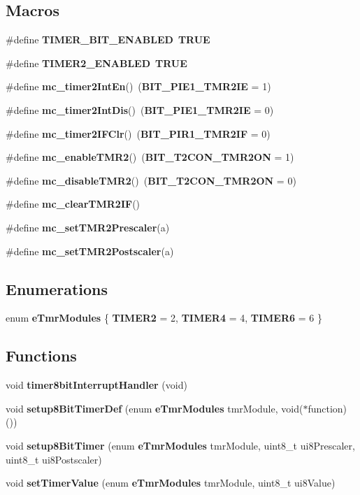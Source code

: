 \subsection*{Macros}
\begin{DoxyCompactItemize}
\item 
\#define {\bf T\-I\-M\-E\-R\-\_\-B\-I\-T\-\_\-\-E\-N\-A\-B\-L\-E\-D}~{\bf T\-R\-U\-E}
\item 
\#define {\bf T\-I\-M\-E\-R2\-\_\-\-E\-N\-A\-B\-L\-E\-D}~{\bf T\-R\-U\-E}
\item 
\#define {\bf mc\-\_\-timer2\-Int\-En}()~({\bf B\-I\-T\-\_\-\-P\-I\-E1\-\_\-\-T\-M\-R2\-I\-E} = 1)
\item 
\#define {\bf mc\-\_\-timer2\-Int\-Dis}()~({\bf B\-I\-T\-\_\-\-P\-I\-E1\-\_\-\-T\-M\-R2\-I\-E} = 0)
\item 
\#define {\bf mc\-\_\-timer2\-I\-F\-Clr}()~({\bf B\-I\-T\-\_\-\-P\-I\-R1\-\_\-\-T\-M\-R2\-I\-F} = 0)
\item 
\#define {\bf mc\-\_\-enable\-T\-M\-R2}()~({\bf B\-I\-T\-\_\-\-T2\-C\-O\-N\-\_\-\-T\-M\-R2\-O\-N} = 1)
\item 
\#define {\bf mc\-\_\-disable\-T\-M\-R2}()~({\bf B\-I\-T\-\_\-\-T2\-C\-O\-N\-\_\-\-T\-M\-R2\-O\-N} = 0)
\item 
\#define {\bf mc\-\_\-clear\-T\-M\-R2\-I\-F}()
\item 
\#define {\bf mc\-\_\-set\-T\-M\-R2\-Prescaler}(a)
\item 
\#define {\bf mc\-\_\-set\-T\-M\-R2\-Postscaler}(a)
\end{DoxyCompactItemize}
\subsection*{Enumerations}
\begin{DoxyCompactItemize}
\item 
enum {\bf e\-Tmr\-Modules} \{ {\bf T\-I\-M\-E\-R2} =  2, 
{\bf T\-I\-M\-E\-R4} =  4, 
{\bf T\-I\-M\-E\-R6} =  6
 \}
\end{DoxyCompactItemize}
\subsection*{Functions}
\begin{DoxyCompactItemize}
\item 
void {\bf timer8bit\-Interrupt\-Handler} (void)
\item 
void {\bf setup8\-Bit\-Timer\-Def} (enum {\bf e\-Tmr\-Modules} tmr\-Module, void($\ast$function)())
\item 
void {\bf setup8\-Bit\-Timer} (enum {\bf e\-Tmr\-Modules} tmr\-Module, uint8\-\_\-t ui8\-Prescaler, uint8\-\_\-t ui8\-Postscaler)
\item 
void {\bf set\-Timer\-Value} (enum {\bf e\-Tmr\-Modules} tmr\-Module, uint8\-\_\-t ui8\-Value)
\end{DoxyCompactItemize}


